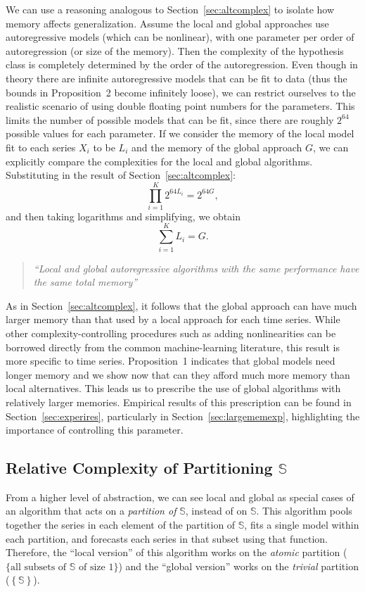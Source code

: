 \documentclass[a4paper]{article}
\theoremstyle{custom}
\begin{document}
We can use a reasoning analogous to Section~\ref{sec:altcomplex} to isolate how memory affects generalization. Assume the local and global approaches use autoregressive models (which can be nonlinear), with one parameter per order of autoregression (or size of the memory). Then the complexity of the hypothesis class is completely determined by the order of the autoregression.
Even though in theory there are infinite autoregressive models that can be fit to data (thus the bounds in Proposition~2 become infinitely loose), we can restrict ourselves to the realistic scenario of using double floating point numbers for the parameters. This limits the number of possible models that can be fit, since there are roughly $2^{64}$ possible values for each parameter. If we consider the memory of the local model fit to each series $X_i$ to be $L_i$ and the memory of the global approach $G$, we can explicitly compare the complexities for the local and global algorithms. Substituting in the result of Section~\ref{sec:altcomplex}:
$$
  \prod_{i=1}^K 2^{64L_i} = 2^{64G},
$$
and then taking logarithms and simplifying, we obtain
$$
  \sum_{i=1}^K L_i = G.
$$

\begin{quote}\itshape
``Local and global autoregressive algorithms with the same performance have the same total memory''
\end{quote}

As in Section~\ref{sec:altcomplex}, it follows that the global approach can have much larger memory than that used by a local approach for each time series. While other complexity-controlling procedures such as adding nonlinearities
can be borrowed directly from the common machine-learning literature, this result is more specific to time series.
Proposition~1 indicates that global models need longer memory and we show now that can they afford much more memory than local alternatives. This leads us to prescribe the use of global algorithms with relatively larger memories.
Empirical results of this prescription can be found in Section~\ref{sec:experires}, particularly in Section~\ref{sec:largememexp}, highlighting the importance of controlling this parameter.

\subsection[Relative Complexity of Partitioning S]{Relative Complexity of Partitioning $\mathbb{S}$}
\label{sec:parti}

From a higher level of abstraction, we can see local and global as special cases of an algorithm that acts on a \textit{partition of} $\mathbb{S}$, instead of on $\mathbb{S}$. This algorithm pools together the series in each element of the partition of $\mathbb{S}$, fits a single model within each partition, and forecasts each series in that subset using that function. Therefore, the ``local version'' of this algorithm works on the \textit{atomic} partition ($\{\text{all subsets of } \mathbb{S}\text{ of size }1\}$) and the ``global version'' works on the \textit{trivial} partition ($\left\{\mathbb{S}\right\}$).
\end{document}
